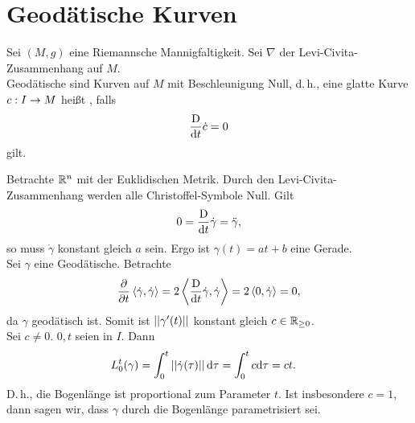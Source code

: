 
\section{Geodätische Kurven}
\Def{}
Sei $(M,g)$ eine Riemannsche Mannigfaltigkeit. Sei $\nabla$ der Levi-Civita-Zusammenhang auf $M$.\\
{Geodätische} sind Kurven auf $M$ mit Beschleunigung Null, d.\,h., eine glatte Kurve $c : I \overset{}{\rightarrow} M $ heißt , falls
\[ \frac{\text{D}}{\text{d} t}\dot{c} = 0 \]
gilt.

\Bsp{}
Betrachte $\mathbb{R}^n$ mit der Euklidischen Metrik. Durch den Levi-Civita-Zusammenhang werden alle Christoffel-Symbole Null. Gilt
\[ 0 = \frac{\text{D}}{\text{d} t}\dot{\gamma} = \ddot{\gamma}, \]
so muss $\dot{\gamma}$ konstant gleich $a$ sein. Ergo ist $\gamma(t) = at +b$ eine Gerade.
\vspace{6 mm}\\

Sei $\gamma$ eine Geodätische. Betrachte
\[ \frac{\partial }{\partial t} \left<\dot{\gamma}, \dot{\gamma}\right> = 2 \left<\frac{\text{D}}{\text{d} t}\dot{\gamma}, \dot{\gamma}\right> =2 \left<0, \dot{\gamma}\right> = 0, \]
da $\gamma$ geodätisch ist. Somit ist $\left|\left|\gamma'(t)\right|\right|$ konstant gleich $c \in \mathbb{R}_{\geq 0}$.\\
Sei $c\neq 0$. $0,t$ seien in $I$. Dann
\begin{align*}
L_0^t(\gamma) &= \int_{0}^t \left|\left|\dot{\gamma}(\tau)\right|\right| \text{d}\tau = \int_{0}^t c \text{d}\tau = ct.
\end{align*}
D.\,h., die Bogenlänge ist proportional zum Parameter $t$. Ist insbesondere $c = 1$, dann sagen wir, dass $\gamma$ durch die Bogenlänge parametrisiert sei.
